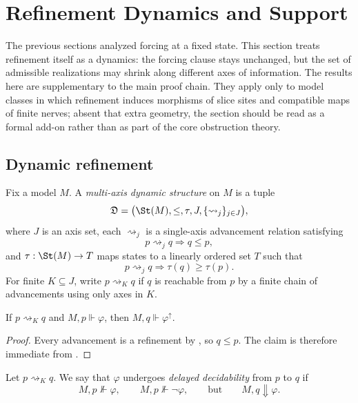 \section{Refinement Dynamics and Support}\label{sec:multiaxis-refinement}

The previous sections analyzed forcing at a fixed state. This section treats refinement itself as a dynamics: the forcing clause stays unchanged, but the set of admissible realizations may shrink along different axes of information. The results here are supplementary to the main proof chain. They apply only to model classes in which refinement induces morphisms of slice sites and compatible maps of finite nerves; absent that extra geometry, the section should be read as a formal add-on rather than as part of the core obstruction theory.

\subsection{Dynamic refinement}

\begin{definition}\label{def:multi-axis-dynamic-structure}
Fix a model $M$. A \emph{multi-axis dynamic structure} on $M$ is a tuple
\[
\mathfrak{D}=\bigl(\St(M),\le,\tau,J,\{\rightsquigarrow_j\}_{j\in J}\bigr),
\]
where $J$ is an axis set, each $\rightsquigarrow_j$ is a single-axis advancement relation satisfying
\[
p\rightsquigarrow_j q \Longrightarrow q\le p,
\]
and $\tau:\St(M)\to T$ maps states to a linearly ordered set $T$ such that
\[
p\rightsquigarrow_j q \Longrightarrow \tau(q)\ge \tau(p).
\]
For finite $K\subseteq J$, write $p\rightsquigarrow_K q$ if $q$ is reachable from $p$ by a finite chain of advancements using only axes in $K$.
\end{definition}

\begin{proposition}\label{prop:updates-preserve-forcing}
If $p\rightsquigarrow_K q$ and $M,p\Vdash\varphi$, then $M,q\Vdash\varphi^\uparrow$.
\end{proposition}

\begin{proof}
Every advancement is a refinement by , so $q\le p$. The claim is therefore immediate from .
\end{proof}

\begin{definition}\label{def:delayed-decidability}
Let $p\rightsquigarrow_K q$. We say that $\varphi$ undergoes \emph{delayed decidability} from $p$ to $q$ if
\[
M,p\nVdash\varphi,\qquad
M,p\nVdash\neg\varphi,\qquad
\text{but}\qquad
M,q\Downarrow\varphi.
\]
\end{definition}

